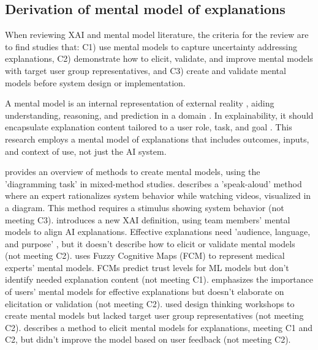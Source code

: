 \subsection{Derivation of mental model of explanations}


When reviewing XAI and mental model literature, the criteria for the review are to find studies that: C1) use mental models to capture uncertainty addressing explanations, C2) demonstrate how to elicit, validate, and improve mental models with target user group representatives, and C3) create and validate mental models before system design or implementation.

A mental model is an internal representation of external reality \cite{Johnson-Laird1986-book}, aiding understanding, reasoning, and prediction in a domain \cite{Gentner2001-incollection}. In explainability, it should encapsulate explanation content tailored to a user role, task, and goal \cite[P. 9]{Hoffman2019metrics-misc}. This research employs a mental model of explanations that includes outcomes, inputs, and context of use, not just the AI system.

\cite[p. 5]{Hoffman2023-MeasureXAI-FrontiersinCS-article} provides an overview of methods to create mental models, using the 'diagramming task' in mixed-method studies. \cite{Garcia2018-XAI-MentalModel-inproceedings} describes a 'speak-aloud' method where an expert rationalizes system behavior while watching videos, visualized in a diagram. This method requires a stimulus showing system behavior (not meeting C3). \cite{Merry2021-article} introduces a new XAI definition, using team members' mental models to align AI explanations. Effective explanations need 'audience, language, and purpose' \cite[p. 5]{Merry2021-article}, but it doesn't describe how to elicit or validate mental models (not meeting C2). \cite{Onari2023-XAI-MentalModel-arxiv-article} uses Fuzzy Cognitive Maps (FCM) \cite{Kosko1986-FuzzyCognitiveMaps-IJMMS-article} to represent medical experts' mental models. FCMs predict trust levels for ML models but don't identify needed explanation content (not meeting C1). \cite{Rutjes2019-XAI-MentalModel-CHI-inproceedings} emphasizes the importance of users' mental models for effective explanations but doesn't elaborate on elicitation or validation (not meeting C2). \cite{Sheridan2023-MentalModel-InProceedings} used design thinking workshops to create mental models but lacked target user group representatives (not meeting C2). \cite{Degen2023-inproceedings,Degen2024-inproceedings} describes a method to elicit mental models for explanations, meeting C1 and C2, but didn't improve the model based on user feedback (not meeting C2).

